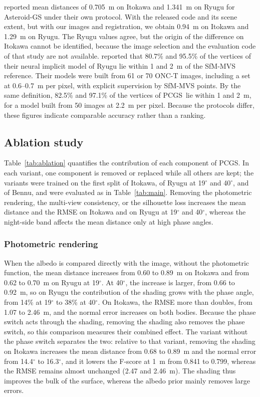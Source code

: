 \documentclass[fleqn,usenatbib]{aa}
\newcommand{\pcgs}{PCGS}
\begin{document}
\citet{Zhang2025AsteroidGS} reported mean distances of 0.705~m on Itokawa and 1.341~m on Ryugu for Asteroid-GS under
their own protocol. With the released code and its scene extent, but with our images and registration, we obtain
0.94~m on Itokawa and 1.29~m on Ryugu. The Ryugu values agree, but the origin of the difference on Itokawa cannot be
identified, because the image selection and the evaluation code of that study are not available. \citet{ChenH2025}
reported that 80.7\% and 95.5\% of the vertices of their neural implicit model of Ryugu lie within 1 and 2~m of the
SfM-MVS reference. Their models were built from 61 or 70 ONC-T images, including a set at 0.6--0.7~m per pixel, with
explicit supervision by SfM-MVS points. By the same definition, 82.5\% and 97.1\% of the vertices of \pcgs\ lie
within 1 and 2~m, for a model built from 50 images at 2.2~m per pixel. Because the protocols differ, these figures
indicate comparable accuracy rather than a ranking.

\subsection{Ablation study}
\label{sec:ablation}

Table~\ref{tab:ablation} quantifies the contribution of each component of \pcgs. In each variant, one component is
removed or replaced while all others are kept; the variants were trained on the first split of Itokawa, of Ryugu at
19$^\circ$ and 40$^\circ$, and of Bennu, and were evaluated as in Table~\ref{tab:main}. Removing the photometric rendering,
the multi-view consistency, or the silhouette loss increases the mean distance and the RMSE on Itokawa and on Ryugu at
19$^\circ$ and 40$^\circ$, whereas the night-side band affects the mean distance only at high phase angles.



\subsubsection{Photometric rendering}
\label{sec:abl_photo}

When the albedo is compared directly with the image, without the photometric function, the mean distance increases
from 0.60 to 0.89~m on Itokawa and from 0.62 to 0.70~m on Ryugu at 19$^\circ$. At 40$^\circ$, the increase is larger,
from 0.66 to 0.92~m, so on Ryugu the contribution of the shading grows with the phase angle, from 14\% at 19$^\circ$ to
38\% at 40$^\circ$. On Itokawa, the RMSE more than doubles, from 1.07 to 2.46~m, and the normal error increases on both
bodies. Because the phase switch acts through the shading, removing the shading also removes the phase switch, so this
comparison measures their combined effect. The variant without the phase switch separates the two: relative to that
variant, removing the shading on Itokawa increases the mean distance from 0.68 to 0.89~m and the normal error from
14.4$^\circ$ to 16.3$^\circ$, and it lowers the F-score at 1~m from 0.841 to 0.799, whereas the RMSE remains almost
unchanged (2.47 and 2.46~m). The shading thus improves the bulk of the surface, whereas the albedo prior mainly removes
large errors.
\end{document}
